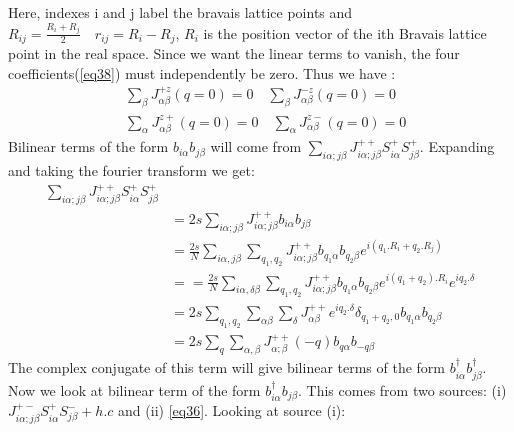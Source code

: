 Here, indexes i and j label the bravais lattice points and $ R_{ij} = \frac{R_i + R_j}{2} \quad r_{ij} = R_i - R_j$, $ R_i $ is the position vector of the ith Bravais lattice point in the real space. Since we want the linear terms to vanish, the four coefficients(\ref{eq38}) must independently be zero. Thus we have :
\begin{equation}\label{40}
\begin{split}
&\sum_{\beta}^{}J^{+z}_{\alpha \beta}(q = 0) = 0 \quad \sum_{\beta}^{}J^{-z}_{\alpha \beta}(q = 0) = 0\\
&\sum_{\alpha}^{}J^{z+}_{\alpha \beta}(q = 0) = 0 \quad \sum_{\alpha}^{}J^{z-}_{\alpha \beta}(q = 0) = 0
\end{split}
\end{equation}
Bilinear terms of the form $ b_{i\alpha}b_{j\beta} $ will come from $ \sum_{i\alpha;j\beta}^{}J^{++}_{i\alpha;j\beta}S^+_{i\alpha}S^+_{j\beta} $. Expanding and taking the fourier transform we get:
\begin{equation}\label{eq41}
\begin{split}
\sum_{i\alpha;j\beta}^{}J^{++}_{i\alpha;j\beta}S^+_{i\alpha}S^+_{j\beta}&\\
&=2s\sum_{i\alpha;j\beta}^{}J^{++}_{i\alpha;j\beta}b_{i\alpha}b_{j\beta}\\
&=\frac{2s}{N}\sum_{i\alpha,j\beta}^{}\sum_{q_1,q_2}^{}J^{++}_{i\alpha;j\beta}b_{q_1\alpha}b_{q_2\beta}e^{i(q_1.R_i + q_2.R_j)}\\
& = =\frac{2s}{N}\sum_{i\alpha,\delta \beta}^{}\sum_{q_1,q_2}^{}J^{++}_{i\alpha;j\beta}b_{q_1\alpha}b_{q_2\beta}e^{i(q_1 + q_2).R_i}e^{iq_2.\delta}\\
& = 2s\sum_{q_1,q_2}^{}\sum_{\alpha \beta}^{}\sum_{\delta}^{}J^{++}_{\alpha \beta}e^{iq_2.\delta}\delta_{q_1+q_2,0}b_{q_1\alpha}b_{q_2\beta}\\
& = 2s\sum_{q}^{}\sum_{\alpha,\beta}^{}J^{++}_{\alpha;\beta}(-q)b_{q\alpha}b_{-q\beta}
\end{split}
\end{equation}
The complex conjugate of this term will give bilinear terms of the form $ b_{i\alpha}^\dagger b_{j\beta}^\dagger $.\\Now we look at bilinear term of the form $ b_{i\alpha}^\dagger b_{j\beta} $. This comes from two sources: (i) $ J^{+-}_{i\alpha;j\beta}S^+_{i\alpha}S^-_{j\beta} + h.c $ and (ii) \ref{eq36}. Looking at source (i):
